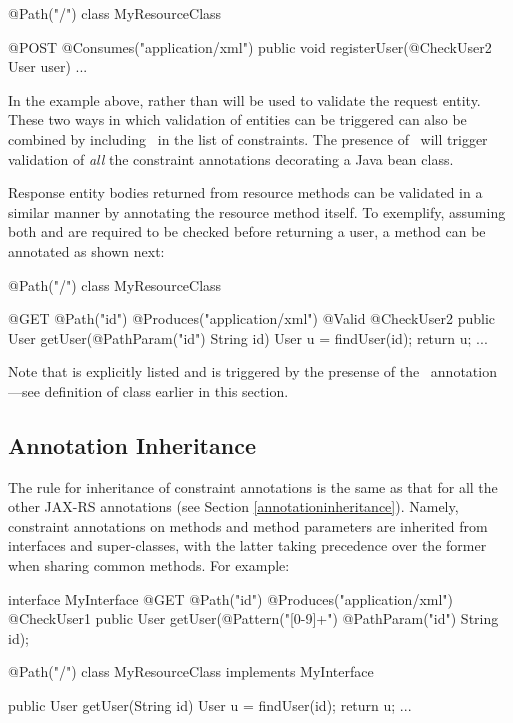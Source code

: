 \begin{listing}{1}
@Path("/")
class MyResourceClass {

    @POST
    @Consumes("application/xml")
    public void registerUser(@CheckUser2 User user) {
        ...
    }
}
\end{listing}

In the example above,  rather than  will be used to validate the request entity. These two ways in which validation of entities can be triggered can also be combined by including \Valid\ in the list of constraints. The presence of \Valid\ will trigger validation of \emph{all} the constraint annotations decorating a Java bean class.

Response entity bodies returned from resource methods can be validated in a similar manner by annotating the resource method itself. To exemplify, assuming both  and  are required to be checked before returning a user, a  method can be annotated as shown next:

\begin{listing}{1}
@Path("/")
class MyResourceClass {

    @GET
    @Path("{id}")
    @Produces("application/xml")
    @Valid @CheckUser2
    public User getUser(@PathParam("id") String id) {
        User u = findUser(id);
        return u;
    }
    ...
}
\end{listing}

Note that  is explicitly listed and  is triggered by the presense of the \Valid\ annotation ---see definition of  class earlier in this section.

\subsection{Annotation Inheritance}

The rule for inheritance of constraint annotations is the same as that for all the other JAX-RS annotations (see Section \ref{annotationinheritance}). Namely, constraint annotations on methods and method parameters are inherited from interfaces and super-classes, with the latter taking precedence over the former when sharing common methods. For example:

\begin{listing}{1}
interface MyInterface {
    @GET
    @Path("{id}")
    @Produces("application/xml")
    @CheckUser1
    public User getUser(@Pattern("[0-9]+") @PathParam("id") String id);
}

@Path("/")
class MyResourceClass implements MyInterface {

    public User getUser(String id) {
        User u = findUser(id);
        return u;
    }
    ...
}
\end{listing}

